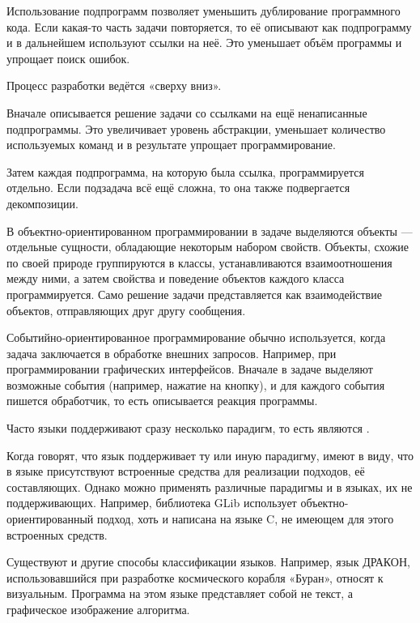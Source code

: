 Использование подпрограмм позволяет уменьшить дублирование
программного кода. Если какая-то часть задачи повторяется, то её
описывают как подпрограмму и в дальнейшем используют ссылки на
неё. Это уменьшает объём программы и упрощает поиск ошибок.

Процесс разработки ведётся «сверху вниз».

Вначале описывается решение задачи со ссылками на ещё ненаписанные
подпрограммы. Это увеличивает уровень абстракции, уменьшает количество
используемых команд и в результате упрощает программирование.

Затем каждая подпрограмма, на которую была ссылка, программируется
отдельно. Если подзадача всё ещё сложна, то она также подвергается
декомпозиции.


В объектно-ориентированном программировании в задаче выделяются
объекты — отдельные сущности, обладающие некоторым набором
свойств. Объекты, схожие по своей природе группируются в классы,
устанавливаются взаимоотношения между ними, а затем свойства и
поведение объектов каждого класса программируется.  Само решение
задачи представляется как взаимодействие объектов, отправляющих друг
другу сообщения.


Событийно-ориентированное программирование обычно используется, когда
задача заключается в обработке внешних запросов. Например, при
программировании графических интерфейсов. Вначале в задаче выделяют
возможные события (например, нажатие на кнопку), и для каждого события
пишется обработчик, то есть описывается реакция программы.


Часто языки поддерживают сразу несколько парадигм, то есть являются
.

Когда говорят, что язык поддерживает ту или иную парадигму, имеют в
виду, что в языке присутствуют встроенные средства для реализации
подходов, её составляющих. Однако можно применять различные парадигмы
и в языках, их не поддерживающих. Например, библиотека GLib использует
объектно-ориентированный подход, хоть и написана на языке C, не
имеющем для этого встроенных средств.

Существуют и другие способы классификации языков. Например, язык
ДРАКОН, использовавшийся при разработке космического корабля «Буран»,
относят к визуальным. Программа на этом языке представляет собой не
текст, а графическое изображение алгоритма.

